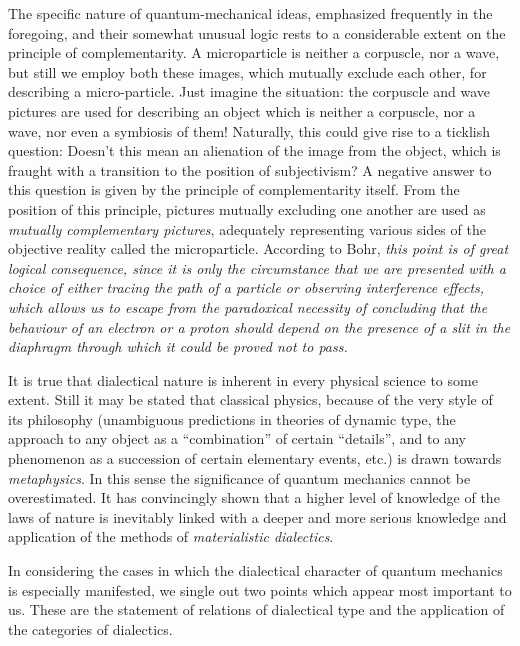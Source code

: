 \documentclass[a4paper,sfsidenotes,colorlinks=true]{tufte-book}
\numberwithin{equation}{section}
\numberwithin{figure}{section}
\begin{document}
The specific nature of quantum-mechanical ideas, emphasized frequently
in the foregoing, and their somewhat unusual logic rests to a
considerable extent on the principle of complementarity. A
microparticle is neither a corpuscle, nor a wave, but still we employ
both these images, which mutually exclude each other, for describing a
micro-particle. Just imagine the situation: the corpuscle and wave
pictures are used for describing an object which is neither a
corpuscle, nor a wave, nor even a symbiosis of them! Naturally, this
could give rise to a ticklish question: Doesn't this mean an
alienation of the image from the object, which is fraught with a
transition to the position of subjectivism? A negative answer to this
question is given by the principle of complementarity itself. From the
position of this principle, pictures mutually excluding one another
are used as \emph{mutually complementary pictures}, adequately
representing various sides of the objective reality called the
microparticle. According to Bohr, \emph{this point is of great logical
  consequence, since it is only the circumstance that we are presented
  with a choice of either tracing the path of a particle or observing
  interference effects, which allows us to escape from the paradoxical
  necessity of concluding that the behaviour of an electron or a
  proton should depend on the presence of a slit in the diaphragm
  through which it could be proved not to pass.}

It is true
that dialectical nature is inherent in every physical science to some
extent. Still it may be stated that classical physics, because of the
very style of its philosophy (unambiguous predictions in theories of
dynamic type, the approach to any object as a ``combination'' of
certain ``details'', and to any phenomenon as a succession of certain
elementary events, etc.) is drawn towards \emph{metaphysics}. In this
sense the significance of quantum mechanics cannot be
overestimated. It has convincingly shown that a higher level of
knowledge of the laws of nature is inevitably linked with a deeper and
more serious knowledge and application of the methods of
\emph{materialistic dialectics}.

In considering the cases in which the dialectical character of quantum
mechanics is especially manifested, we single out two points which
appear most important to us. These are the statement of relations of
dialectical type and the application of the categories of dialectics.
\end{document}
